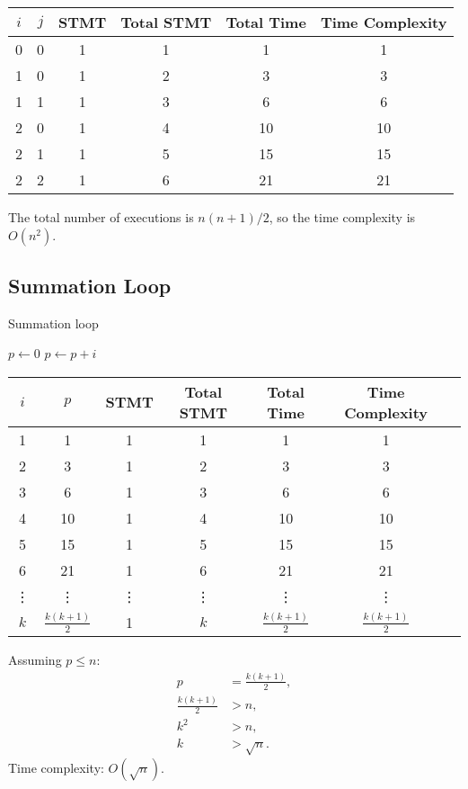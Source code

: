 \documentclass[twoside]{article}
\begin{document}
\begin{table}[H]
    \centering
    \begin{tabular}{|c|c|c|c|c|c|}
        \hline
        $i$ & $j$ & STMT & Total STMT & Total Time & Time Complexity \\
        \hline
        0 & 0 & 1 & 1 & 1 & 1 \\
        1 & 0 & 1 & 2 & 3 & 3 \\
        1 & 1 & 1 & 3 & 6 & 6 \\
        2 & 0 & 1 & 4 & 10 & 10 \\
        2 & 1 & 1 & 5 & 15 & 15 \\
        2 & 2 & 1 & 6 & 21 & 21 \\
        \hline
    \end{tabular}
\end{table}

The total number of executions is $n(n+1)/2$, so the time complexity is $O(n^2)$.

\subsection{Summation Loop}
\begin{algorithm}[H]
    \caption{Summation loop}\label{simple_for5}
    \begin{algorithmic}
        \State $p \gets 0$
            \State $p \gets p + i$
        \EndFor
    \end{algorithmic}
\end{algorithm}

\begin{table}[H]
    \centering
    \begin{tabular}{|c|c|c|c|c|c|c|}
        \hline
        $i$ & $p$ & STMT & Total STMT & Total Time & Time Complexity \\
        \hline
        1 & 1 & 1 & 1 & 1 & 1 \\
        2 & 3 & 1 & 2 & 3 & 3 \\
        3 & 6 & 1 & 3 & 6 & 6 \\
        4 & 10 & 1 & 4 & 10 & 10 \\
        5 & 15 & 1 & 5 & 15 & 15 \\
        6 & 21 & 1 & 6 & 21 & 21 \\
        \vdots & \vdots & \vdots & \vdots & \vdots & \vdots \\
        $k$ & $\frac{k(k+1)}{2}$ & 1 & $k$ & $\frac{k(k+1)}{2}$ & $\frac{k(k+1)}{2}$ \\
        \hline
    \end{tabular}
\end{table}

Assuming $p \leq n$:
\[
\begin{aligned}
    p &= \frac{k(k+1)}{2}, \\
    \frac{k(k+1)}{2} &> n, \\
    k^2 &> n, \\
    k &> \sqrt{n}.
\end{aligned}
\]
Time complexity: $O(\sqrt{n})$.
\end{document}
